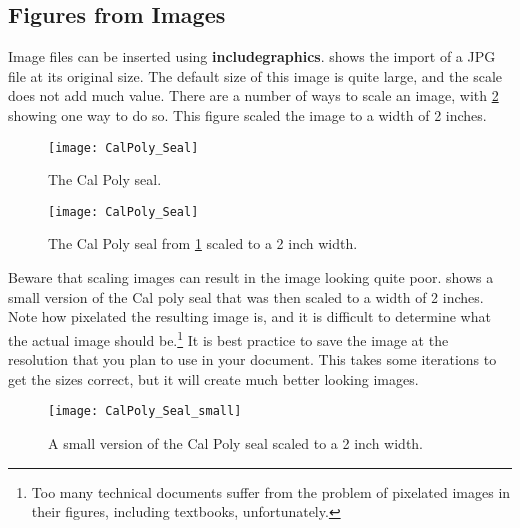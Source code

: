 \subsection{Figures from Images} \label{sec:FiguresFromImages}
    Image files can be inserted using \textbf{includegraphics}.
     shows the import of a JPG file at its original size.
    The default size of this image is quite large, and the scale does not add much value.
    There are a number of ways to scale an image, with \cref{fig:CalPolySeal_small} showing one way to do so.
    This figure scaled the image to a width of 2 inches.
    \makeatletter
    \@currsize
    \makeatother
    \begin{figure}
        \centering
        \texttt{[image: CalPoly\_Seal]}
        \caption{The Cal Poly seal.}
        \label{fig:CalPolySeal1}
    \end{figure}
    \begin{figure}
        \centering
        \texttt{[image: CalPoly\_Seal]}
        \caption{The Cal Poly seal from \cref{fig:CalPolySeal1} scaled to a 2 inch width.}
        \label{fig:CalPolySeal_small}
    \end{figure}

    Beware that scaling images can result in the image looking quite poor.
     shows a small version of the Cal poly seal that was then scaled to a width of 2 inches.
    Note how pixelated the resulting image is, and it is difficult to determine what the actual image should be.\footnote{Too many technical documents suffer from the problem of pixelated images in their figures, including textbooks, unfortunately.}
    It is best practice to save the image at the resolution that you plan to use in your document.
    This takes some iterations to get the sizes correct, but it will create much better looking images.
    \begin{figure}
        \centering
        \texttt{[image: CalPoly\_Seal\_small]}
        \caption{A small version of the Cal Poly seal scaled to a 2 inch width.}
        \label{fig:CalPolySeal_scaled}
    \end{figure}

